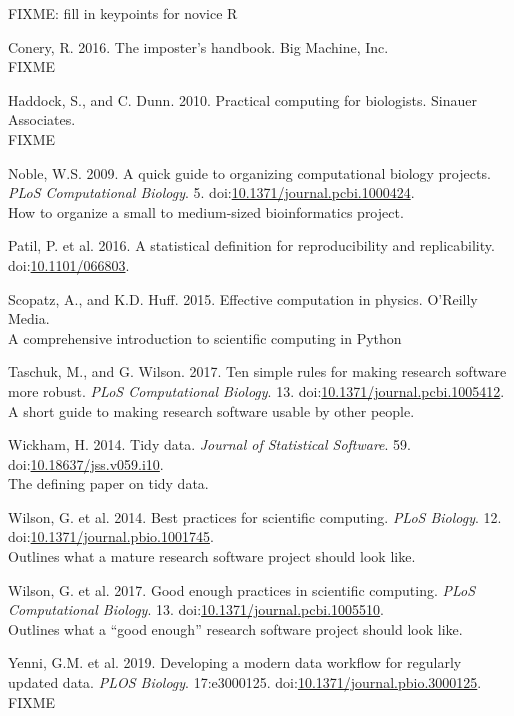 \documentclass[]{Nemilov}
\begin{document}
FIXME: fill in keypoints for novice R

\hypertarget{refs}{}
\leavevmode\hypertarget{ref-Cone2016}{}%
Conery, R. 2016. The imposter's handbook. Big Machine, Inc.\\
FIXME

\leavevmode\hypertarget{ref-Hadd2010}{}%
Haddock, S., and C. Dunn. 2010. Practical computing for biologists. Sinauer Associates.\\
FIXME

\leavevmode\hypertarget{ref-Nobl2009}{}%
Noble, W.S. 2009. A quick guide to organizing computational biology projects. \emph{PLoS Computational Biology}. 5. doi:\href{https://doi.org/10.1371/journal.pcbi.1000424}{10.1371/journal.pcbi.1000424}.\\
How to organize a small to medium-sized bioinformatics project.

\leavevmode\hypertarget{ref-Patil2016}{}%
Patil, P. et al. 2016. A statistical definition for reproducibility and replicability. doi:\href{https://doi.org/10.1101/066803}{10.1101/066803}.

\leavevmode\hypertarget{ref-Scop2015}{}%
Scopatz, A., and K.D. Huff. 2015. Effective computation in physics. O'Reilly Media.\\
A comprehensive introduction to scientific computing in Python

\leavevmode\hypertarget{ref-Tasc2017}{}%
Taschuk, M., and G. Wilson. 2017. Ten simple rules for making research software more robust. \emph{PLoS Computational Biology}. 13. doi:\href{https://doi.org/10.1371/journal.pcbi.1005412}{10.1371/journal.pcbi.1005412}.\\
A short guide to making research software usable by other people.

\leavevmode\hypertarget{ref-Wick2014}{}%
Wickham, H. 2014. Tidy data. \emph{Journal of Statistical Software}. 59. doi:\href{https://doi.org/10.18637/jss.v059.i10}{10.18637/jss.v059.i10}.\\
The defining paper on tidy data.

\leavevmode\hypertarget{ref-Wils2014}{}%
Wilson, G. et al. 2014. Best practices for scientific computing. \emph{PLoS Biology}. 12. doi:\href{https://doi.org/10.1371/journal.pbio.1001745}{10.1371/journal.pbio.1001745}.\\
Outlines what a mature research software project should look like.

\leavevmode\hypertarget{ref-Wils2017}{}%
Wilson, G. et al. 2017. Good enough practices in scientific computing. \emph{PLoS Computational Biology}. 13. doi:\href{https://doi.org/10.1371/journal.pcbi.1005510}{10.1371/journal.pcbi.1005510}.\\
Outlines what a ``good enough'' research software project should look like.

\leavevmode\hypertarget{ref-Yenn2019}{}%
Yenni, G.M. et al. 2019. Developing a modern data workflow for regularly updated data. \emph{PLOS Biology}. 17:e3000125. doi:\href{https://doi.org/10.1371/journal.pbio.3000125}{10.1371/journal.pbio.3000125}.\\
FIXME
\end{document}
